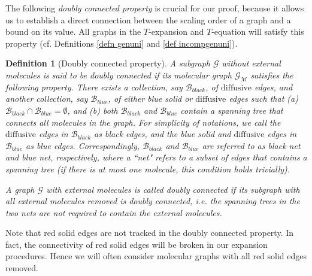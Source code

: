 \documentclass{article}
\newcommand{\1}{\mathds{1}}
\numberwithin{equation}{section}
\renewcommand{\cal}{\mathcal}
\newcommand{\dashed}{\text{diffusive}}
\theoremstyle{plain} %
\newtheorem{definition}[theorem]{Definition}
\theoremstyle{remark}
\newtheorem{remark}[theorem]{Remark}
\newcommand{\cob}{\color{purple}}
\newcommand{\nc}{\normalcolor}
\newcommand{\incomp}{{\text{$T$-equation}}}
\begin{document}
The following \emph{doubly connected property} is crucial for our proof, because it allows us to establish a direct connection between the scaling order of a graph and a bound on its value. All graphs in the $T$-expansion and $\incomp$ will satisfy this property (cf. Definitions \ref{defn genuni} and \ref{def incompgenuni}). 

\begin{definition} [Doubly connected property]\label{def 2net}  %
A subgraph $\cal G$ without external molecules is said to be doubly connected if its molecular graph $\cal G_{\cal M}$ satisfies the following property. There exists a collection, say $\cal B_{black}$, of $\dashed$ edges, and another collection, say $\cal B_{blue}$, of  either blue solid or  $\dashed$ edges  such that (a) $\cal B_{black}\cap \cal B_{blue}=\emptyset$, and (b) both $\cal B_{black}$ and $\cal B_{blue}$ contain a spanning tree that connects all molecules in the graph. For simplicity of notations, we call the $\dashed$ edges in $\cal B_{black}$ as black edges, and the blue solid and $\dashed$ edges in $\cal B_{blue}$ as blue edges. Correspondingly, $\cal B_{black}$ and $\cal B_{blue}$ are referred to as black net and blue net, respectively, where a ``net" refers to a subset of edges that contains a spanning tree (if there is at most one molecule, this condition holds trivially).

A graph $\cal G$ with external molecules is called doubly connected if its subgraph with all external molecules removed is doubly connected,  i.e. the spanning trees in the two nets are not required to contain the external molecules.
\end{definition}
Note that red solid edges are not tracked in the doubly connected property. In fact, the connectivity of red solid edges will be broken in our expansion procedures. Hence we will often consider molecular graphs with all red solid edges removed. %
\end{document}
